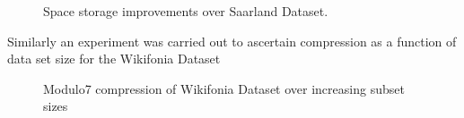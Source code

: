 \documentclass{article}
\begin{document}
\begin{figure}[h]
\begin{center}
{}
 \caption{Space storage improvements over Saarland Dataset.}
 \label{fig:storageimprovement}
\end{center}
\end{figure}

\noindent Similarly an experiment was carried out to ascertain compression as a function of data set size for the Wikifonia Dataset \cite{WikifoniaDataset}

\begin{figure}[h]
\begin{center}
{}
 \caption{Modulo7 compression of Wikifonia Dataset over increasing subset sizes}
 \label{fig:compression}
\end{center}
\end{figure}
\end{document}
